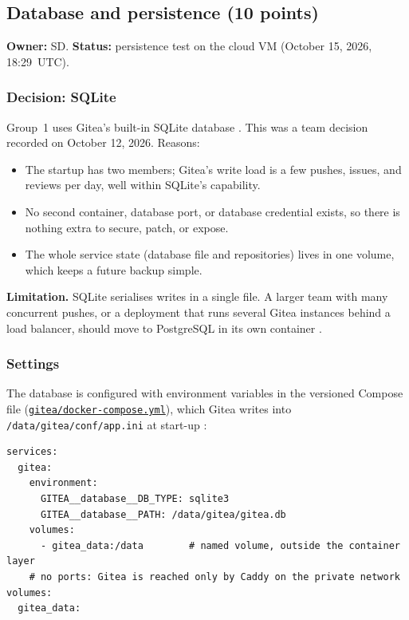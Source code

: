 \subsection{Database and persistence (10 points)}
\label{Section:giteaDatabase}
\textbf{Owner:} SD. \textbf{Status:} persistence test on the cloud VM
\StatusPass{} (October 15, 2026, 18:29~UTC).

\subsubsection{Decision: SQLite}
Group~1 uses Gitea's built-in SQLite database \cite{GiteaDBPrep}. This was a
team decision recorded on October 12, 2026. Reasons:
\begin{itemize}[nosep]
  \item The startup has two members; Gitea's write load is a few pushes,
  issues, and reviews per day, well within SQLite's capability.
  \item No second container, database port, or database credential exists, so
  there is nothing extra to secure, patch, or expose.
  \item The whole service state (database file and repositories) lives in one
  volume, which keeps a future backup simple.
\end{itemize}
\textbf{Limitation.} SQLite serialises writes in a single file. A larger team
with many concurrent pushes, or a deployment that runs several Gitea instances
behind a load balancer, should move to PostgreSQL in its own container
\cite{DosManual}.

\subsubsection{Settings}
The database is configured with environment variables in the versioned
Compose file (\href{\RepoURL/blob/main/assignment-4/gitea/docker-compose.yml}{\texttt{gitea/docker-compose.yml}}),
which Gitea writes into \texttt{/data/gitea/conf/app.ini} at start-up
\cite{GiteaConfig}:
\begin{verbatim}
services:
  gitea:
    environment:
      GITEA__database__DB_TYPE: sqlite3
      GITEA__database__PATH: /data/gitea/gitea.db
    volumes:
      - gitea_data:/data        # named volume, outside the container layer
    # no ports: Gitea is reached only by Caddy on the private network
volumes:
  gitea_data:
\end{verbatim}

